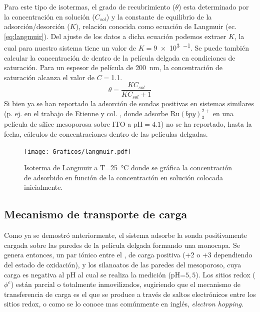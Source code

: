 		Para este tipo de isotermas, el grado de recubrimiento ($\theta$) esta determinado por la concentración en solución ($C_{sol}$) y la constante de equilibrio de la adsorción/desorción ($K$), relación conocida como ecuación de Langmuir (ec. \ref{eq:langmuir}).  Del ajuste de los datos a dicha ecuación podemos extraer $K$, la cual para nuestro sistema tiene un valor de $K=$\SI{9e3}{\Molar^{-1}}. Se puede también calcular la concentración de \ru\space dentro de la película delgada en condiciones de saturación. Para un espesor de película de \SI{200}{nm}, la concentración de saturación alcanza el valor de $C\!=$\SI{1.1}{\Molar}.
			\begin{equation}
					\theta = \frac{KC_{sol}}{KC_{sol}+1}
					\label{eq:langmuir}
			\end{equation}
		Si bien ya se han reportado la adsorción de sondas positivas en sistemas similares (p. ej. en el trabajo de Etienne y col. \cite{Etienne2007}, donde adsorbe $\text{Ru}(bpy)_3^{2+}$ en una película de sílice mesoporosa sobre ITO a $\text{pH}=4.1$) no se ha reportado, hasta la fecha, cálculos de concentraciones dentro de las películas delgadas.

			\begin{figure}[h!]
					\centering
			 	    \texttt{[image: Graficos/langmuir.pdf]}
			        \caption[Isoterma de Langmuir]{Isoterma de Langmuir a T=\SI{25}{\celsius} donde se gráfica la concentración de \aminorutenio\space adsorbido en función de la concentración en solución colocada inicialmente.}
			        \label{fig:langmuir}
		      	\end{figure} 	
	
	\subsection{Mecanismo de transporte de carga}

	 	 Como ya se demostró anteriormente, el sistema adsorbe la sonda positivamente cargada sobre las paredes de la película delgada formando una monocapa. Se genera entonces, un par iónico entre el \ru, de carga positiva (+2 o +3 dependiendo del estado de oxidación), y los silanoatos de las paredes del mesoporoso, cuya carga es negativa al pH al cual se realiza la medición (pH=$5,5$). Los sitios redox ($\phi^{e}$) están parcial o totalmente inmovilizados, sugiriendo que el mecanismo de transferencia de carga es el que se produce a través de saltos electrónicos entre los sitios redox, o como se lo conoce mas comúnmente en inglés, \textit{electron hopping}. \cite{Rohlfing2005,Vila2015,Audebert2015}

